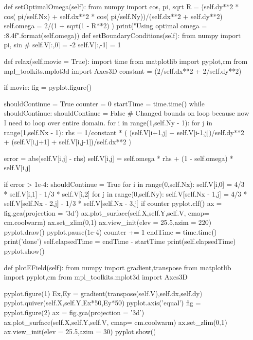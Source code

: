 \begin{enumerate}
\begin{codeexample}
\begin{VerbatimOut}{\listingFile}
    def setOptimalOmega(self):
        from numpy import cos, pi, sqrt
        R = (self.dy**2 * cos( pi/self.Nx) + self.dx**2 * cos( pi/self.Ny))/(self.dx**2 + self.dy**2)
        self.omega = 2/(1 + sqrt(1 - R**2) )
        print("Using optimal omega = {:8.4f}".format(self.omega))
    def setBoundaryConditions(self):
        from numpy import pi, sin
        # self.V[:,0] = -2
        self.V[:,-1] = 1

    def relax(self,movie = True):
        import time
        from matplotlib import pyplot,cm
        from mpl_toolkits.mplot3d import Axes3D
        constant = (2/self.dx**2 + 2/self.dy**2)


        if movie:
            fig = pyplot.figure()

        shouldContinue = True
        counter = 0
        startTime = time.time()
        while shouldContinue:
            shouldContinue = False
            # Changed bounds on loop because now I need to loop over entire domain.
            for i in range(1,self.Ny - 1):
                for j in range(1,self.Nx - 1):
                    rhs = 1/constant *  ( (self.V[i+1,j] + self.V[i-1,j])/self.dy**2 + (self.V[i,j+1] + self.V[i,j-1])/self.dx**2 )

                    error = abs(self.V[i,j] - rhs)
                    self.V[i,j] = self.omega * rhs + (1 - self.omega) * self.V[i,j]

                    if error > 1e-4:
                        shouldContinue = True
            for i in range(0,self.Nx):
                self.V[i,0] = 4/3 * self.V[i,1] - 1/3 * self.V[i,2]
            for j in range(0,self.Ny):
                self.V[self.Nx - 1,j] = 4/3 * self.V[self.Nx - 2,j] - 1/3 * self.V[self.Nx - 3,j]
            if counter %
                pyplot.clf()
                ax = fig.gca(projection = '3d')
                ax.plot_surface(self.X,self.Y,self.V, cmap= cm.coolwarm)
                ax.set_zlim(0,1)
                ax.view_init(elev = 25.5,azim = 220)
                pyplot.draw()
                pyplot.pause(1e-4)
            counter += 1
        endTime = time.time()
        print('done')
        self.elapsedTime = endTime - startTime
        print(self.elapsedTime)
        pyplot.show()

    def plotEField(self):
        from numpy import gradient,transpose
        from matplotlib import pyplot,cm
        from mpl_toolkits.mplot3d import Axes3D

        pyplot.figure(1)
        Ex,Ey = gradient(transpose(self.V),self.dx,self.dy)
        pyplot.quiver(self.X,self.Y,Ex*50,Ey*50)
        pyplot.axis('equal')
        fig = pyplot.figure(2)
        ax = fig.gca(projection = '3d')
        ax.plot_surface(self.X,self.Y,self.V, cmap= cm.coolwarm)
        ax.set_zlim(0,1)
        ax.view_init(elev = 25.5,azim = 30)
        pyplot.show()


\end{VerbatimOut}
\end{codeexample}
\end{enumerate}
